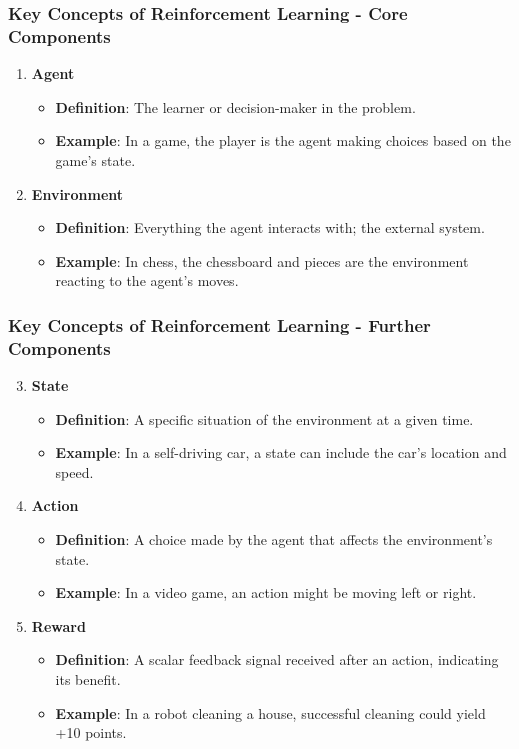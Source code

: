 \documentclass[aspectratio=169]{beamer}
\begin{document}
\begin{frame}[fragile]
    \frametitle{Key Concepts of Reinforcement Learning - Core Components}
    \begin{enumerate}
        \item \textbf{Agent}
        \begin{itemize}
            \item \textbf{Definition}: The learner or decision-maker in the problem.
            \item \textbf{Example}: In a game, the player is the agent making choices based on the game’s state.
        \end{itemize}
        
        \item \textbf{Environment}
        \begin{itemize}
            \item \textbf{Definition}: Everything the agent interacts with; the external system.
            \item \textbf{Example}: In chess, the chessboard and pieces are the environment reacting to the agent’s moves.
        \end{itemize}
    \end{enumerate}
\end{frame}

\begin{frame}[fragile]
    \frametitle{Key Concepts of Reinforcement Learning - Further Components}
    \begin{enumerate}
        \setcounter{enumi}{2}
        \item \textbf{State}
        \begin{itemize}
            \item \textbf{Definition}: A specific situation of the environment at a given time.
            \item \textbf{Example}: In a self-driving car, a state can include the car's location and speed.
        \end{itemize}

        \item \textbf{Action}
        \begin{itemize}
            \item \textbf{Definition}: A choice made by the agent that affects the environment’s state.
            \item \textbf{Example}: In a video game, an action might be moving left or right.
        \end{itemize}

        \item \textbf{Reward}
        \begin{itemize}
            \item \textbf{Definition}: A scalar feedback signal received after an action, indicating its benefit.
            \item \textbf{Example}: In a robot cleaning a house, successful cleaning could yield +10 points.
        \end{itemize}
    \end{enumerate}
\end{frame}
\end{document}
